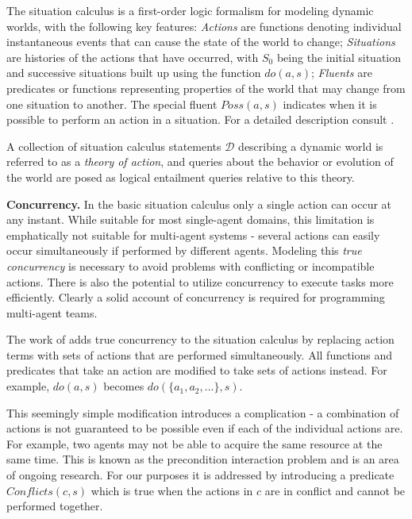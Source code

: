 \documentclass[times, 10pt, twocolumn]{article}
\begin{document}


The situation calculus is a first-order logic formalism for modeling
dynamic worlds, with the following key features: \emph{Actions} are
functions denoting individual instantaneous events that can cause
the state of the world to change; \emph{Situations} are histories
of the actions that have occurred, with $S_{0}$ being the initial
situation and successive situations built up using the function $do(a,s)$;
\emph{Fluents} are predicates or functions representing properties
of the world that may change from one situation to another. The special
fluent $Poss(a,s)$ indicates when it is possible to perform an action
in a situation. For a detailed description consult \cite{pirri99contributions_sitcalc}.

A collection of situation calculus statements $\mathcal{D}$ describing
a dynamic world is referred to as a \emph{theory of action}, and queries
about the behavior or evolution of the world are posed as logical
entailment queries relative to this theory.

\textbf{Concurrency.} In the basic situation calculus only
a single action can occur at any instant. While suitable for most
single-agent domains, this limitation is emphatically not suitable
for multi-agent systems - several actions can easily occur simultaneously
if performed by different agents. Modeling this \emph{true concurrency}
is necessary to avoid problems with conflicting or incompatible actions.
There is also the potential to utilize concurrency to execute tasks
more efficiently. Clearly a solid account of concurrency is required
for programming multi-agent teams.

The work of \cite{lin92sc_conc,reiter96sc_nat_conc} adds true concurrency
to the situation calculus by replacing action terms with sets of actions
that are performed simultaneously. All functions and predicates that
take an action are modified to take sets of actions instead. For example,
$do(a,s)$ becomes $do(\{ a_{1},a_{2},...\},s)$.

This seemingly simple modification introduces a complication - a combination
of actions is not guaranteed to be possible even if each of the individual
actions are. For example, two agents may not be able to acquire the
same resource at the same time. This is known as the precondition
interaction problem \cite{pinto94temporal} and is an area of ongoing
research. For our purposes it is addressed by introducing a predicate
$Conflicts(c,s)$ which is true when the actions in $c$ are in conflict
and cannot be performed together.
\end{document}
